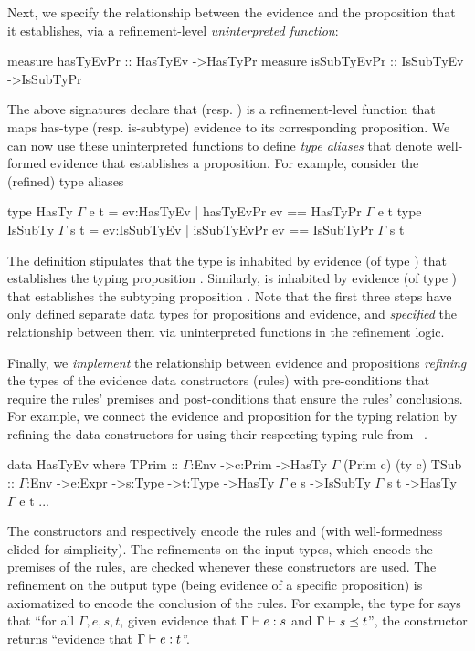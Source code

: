 %
Next, we specify the relationship between the evidence and the proposition
that it establishes, via a refinement-level \emph{uninterpreted function}:
%
\begin{mcode}
  measure hasTyEvPr   :: HasTyEv ->HasTyPr
  measure isSubTyEvPr :: IsSubTyEv ->IsSubTyPr
\end{mcode}
%
The above signatures declare that  (resp. )
is a refinement-level function that maps has-type (resp. is-subtype)
evidence to its corresponding proposition.
%
We can now use these uninterpreted functions to define \emph{type aliases}
that denote well-formed evidence that establishes a proposition.
%
For example, consider the (refined) type aliases
%
\begin{mcode}
  type HasTy   $\Gamma$ e t = {ev:HasTyEv   | hasTyEvPr ev == HasTyPr $\Gamma$ e t }
  type IsSubTy $\Gamma$ s t = {ev:IsSubTyEv | isSubTyEvPr ev == IsSubTyPr $\Gamma$ s t }
\end{mcode}
%
The definition stipulates that the type 
is inhabited by evidence (of type ) that
establishes the typing proposition .
%
Similarly,  is inhabited by evidence
(of type ) that establishes the subtyping
proposition .
%
Note that the first three steps have only defined separate data types
for propositions and evidence, and \emph{specified} the relationship
between them via uninterpreted functions in the refinement logic.

%
Finally, we \emph{implement} the relationship between
evidence and propositions \emph{refining} the types of the evidence
data constructors (rules) with pre-conditions that require
the rules' premises and post-conditions that ensure
the rules' conclusions.
%
For example, we connect the evidence and proposition for the
typing relation by refining the data constructors for 
using their respecting typing rule
from ~.
%
\begin{mcode}
  data HasTyEv where
    TPrim :: $\Gamma$:Env ->c:Prim ->HasTy $\Gamma$ (Prim c) (ty c)
    TSub  :: $\Gamma$:Env ->e:Expr ->s:Type ->t:Type 
          ->HasTy $\Gamma$ e s ->IsSubTy $\Gamma$ s t ->HasTy $\Gamma$ e t
    ...
\end{mcode}
%
The constructors  and  respectively
encode the rules \tPrim and \tSub (with 
well-formedness elided for simplicity).
%
The refinements on the input types, 
which encode the premises of the rules,
are checked whenever these constructors are used. 
The refinement on the 
output type (being evidence of a specific proposition)
is axiomatized to encode the conclusion of the rules.
%
For example, the type for 
says that ``for all $\Gamma, e, s, t$,
given evidence that ${\Gamma} \vdash {e} : {s}$ and ${\Gamma} \vdash s \preceq t$'',
the constructor returns ``evidence that ${\Gamma} \vdash {e} : {t}$''.

